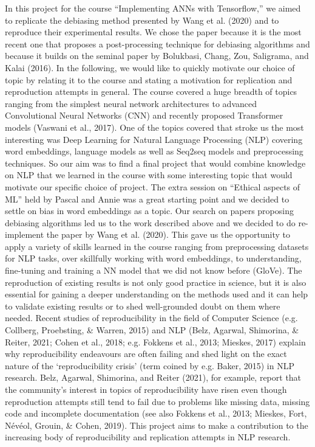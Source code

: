 \documentclass[
  english,
  man,floatsintext]{apa6}
\begin{document}
In this project for the course ``Implementing ANNs with Tensorflow,'' we aimed to replicate the debiasing method presented by Wang et al. (2020) and to reproduce their experimental results. We chose the paper because it is the most recent one that proposes a post-processing technique for debiasing algorithms and because it builds on the seminal paper by Bolukbasi, Chang, Zou, Saligrama, and Kalai (2016).
In the following, we would like to quickly motivate our choice of topic by relating it to the course and stating a motivation for replication and reproduction attempts in general.
The course covered a huge breadth of topics ranging from the simplest neural network architectures to advanced Convolutional Neural Networks (CNN) and recently proposed Transformer models (Vaswani et al., 2017). One of the topics covered that stroke us the most interesting was Deep Learning for Natural Language Processing (NLP) covering word embeddings, language models as well as Seq2seq models and preprocessing techniques. So our aim was to find a final project that would combine knowledge on NLP that we learned in the course with some interesting topic that would motivate our specific choice of project. The extra session on ``Ethical aspects of ML'' held by Pascal and Annie was a great starting point and we decided to settle on bias in word embeddings as a topic. Our search on papers proposing debiasing algorithms led us to the work described above and we decided to do re-implement the paper by Wang et al. (2020). This gave us the opportunity to apply a variety of skills learned in the course ranging from preprocessing datasets for NLP tasks, over skillfully working with word embeddings, to understanding, fine-tuning and training a NN model that we did not know before (GloVe).
The reproduction of existing results is not only good practice in science, but it is also essential for gaining a deeper understanding on the methods used and it can help to validate existing results or to shed well-grounded doubt on them where needed. Recent studies of reproducibility in the field of Computer Science (e.g. Collberg, Proebsting, \& Warren, 2015) and NLP (Belz, Agarwal, Shimorina, \& Reiter, 2021; Cohen et al., 2018; e.g. Fokkens et al., 2013; Mieskes, 2017) explain why reproducibility endeavours are often failing and shed light on the exact nature of the `reproducibility crisis' (term coined by e.g. Baker, 2015) in NLP research. Belz, Agarwal, Shimorina, and Reiter (2021), for example, report that the community's interest in topics of reproducibility have risen even though reproduction attempts still tend to fail due to problems like missing data, missing code and incomplete documentation (see also Fokkens et al., 2013; Mieskes, Fort, Névéol, Grouin, \& Cohen, 2019).
This project aims to make a contribution to the increasing body of reproducibility and replication attempts in NLP research.
\end{document}
